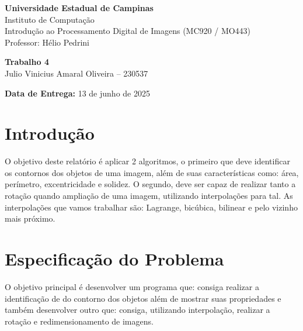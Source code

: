 \documentclass{article}
\begin{document}
    \begin{center}
        \Large \textbf{Universidade Estadual de Campinas} \\
        \large Instituto de Computação \\
        \vspace{0.5cm}
        \large Introdução ao Processamento Digital de Imagens (MC920 / MO443) \\
        \large Professor: Hélio Pedrini
    \end{center}

    \vspace{2cm}

    \begin{center}
        \LARGE \textbf{Trabalho 4} \\
        \vspace{0.5cm}
        \Large Julio Vinicius Amaral Oliveira – 230537
    \end{center}

    \vspace{2cm}

    \begin{flushright}
        \large \textbf{Data de Entrega:} 13 de junho de 2025
    \end{flushright}

    \newpage


    \section{Introdução}\label{sec:introducao}
    O objetivo deste relatório é aplicar 2 algoritmos, o primeiro que deve identificar os contornos dos objetos de uma imagem, além de suas características como:
    área, perímetro, excentricidade e solidez.
    O segundo, deve ser capaz de realizar tanto a rotação quando ampliação de uma imagem, utilizando interpolações para tal.
    As interpolações que vamos trabalhar são: Lagrange, bicúbica, bilinear e pelo vizinho mais próximo.


    \section{Especificação do Problema}\label{sec:especificacao-do-problema}
    O objetivo principal é desenvolver um programa que: consiga realizar a identificação de do contorno dos objetos além
    de mostrar suas propriedades e também desenvolver outro que: consiga, utilizando interpolação, realizar a rotação e
    redimensionamento de imagens.
\end{document}
